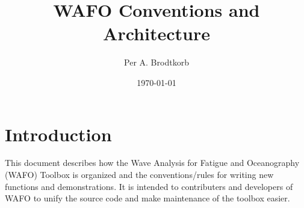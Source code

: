\documentclass[10pt,a4paper]{article}   %
\begin{document}
    
\newcommand{\eg}{e.g.\xspace}
\newcommand{\ie}{i.e.,\xspace}

\newcommand{\etc}{etc.\@\xspace}
\renewcommand{\textfraction}{0.05}
\renewcommand{\topfraction}{0.95}
\renewcommand{\bottomfraction}{0.95}
\renewcommand{\floatpagefraction}{0.85}
\setcounter{totalnumber}{5}

\title{ WAFO Conventions and Architecture}
\author{ Per A. Brodtkorb}

\date{\today}
\maketitle

\section{Introduction}
This document describes how the Wave Analysis for Fatigue and Oceanography (WAFO) Toolbox
is organized and the conventions/rules for writing new functions
and demonstrations. 
It is intended to contributers and developers of WAFO to unify 
the source code and make maintenance of the toolbox easier.
\end{document}
